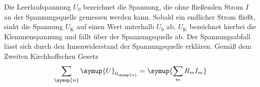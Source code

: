 Die Leerlaufspannung $U_{\text{0}}$ bezeichnet die Spannung, die ohne
fließenden Strom $I$ an der Spannungsquelle gemessen werden kann.
Sobald ein endlicher Strom fließt, sinkt die Spannung $U_{\text{K}}$ auf einen
Wert unterhalb $U_{\text{0}}$ ab. $U_{\text{K}}$ bezeichnet hierbei die
Klemmenspannung und fällt über der Spannungsquelle ab.
Der Spannungsabfall lässt sich durch den Innenwiderstand der Spannungsquelle
erklären.
Gemäß dem Zweiten Kirchhoffschen Gesetz
\begin{equation}
  \sum_\symup{n} \symup{U}_{0_\symup{n}} = \symup{\sum_m R_m I_m}
  \label{eqn:kirch}
\end{equation}
